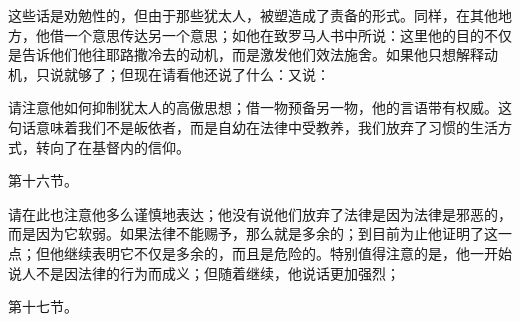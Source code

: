这些话是劝勉性的，但由于那些犹太人，被塑造成了责备的形式。同样，在其他地方，他借一个意思传达另一个意思；如他在致罗马人书中所说：这里他的目的不仅是告诉他们他往耶路撒冷去的动机，而是激发他们效法施舍。如果他只想解释动机，只说就够了；但现在请看他还说了什么：又说：\par

请注意他如何抑制犹太人的高傲思想；借一物预备另一物，他的言语带有权威。这句话意味着我们不是皈依者，而是自幼在法律中受教养，我们放弃了习惯的生活方式，转向了在基督内的信仰。\par

第十六节。\par

请在此也注意他多么谨慎地表达；他没有说他们放弃了法律是因为法律是邪恶的，而是因为它软弱。如果法律不能赐予，那么就是多余的；到目前为止他证明了这一点；但他继续表明它不仅是多余的，而且是危险的。特别值得注意的是，他一开始说人不是因法律的行为而成义；但随着继续，他说话更加强烈；\par

第十七节。\par

